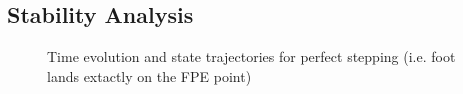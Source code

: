 
\subsection{Stability Analysis} %
\label{sub:overstepping_understepping_simulation}

\begin{figure}[!b]
	\begin{center}
	\end{center}
  	\caption{Time evolution and state trajectories for perfect stepping (i.e. foot lands extactly on the FPE point)}
	\label{sim:perfect}
\end{figure}


